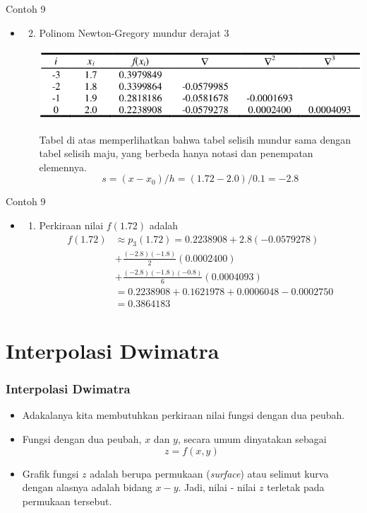 \documentclass[pdflatex,compress,mathserif]{beamer}
\begin{document}
\begin{frame}{Contoh 9}
	\begin{itemize}
		\item[]
		\begin{enumerate}
			\setcounter{enumi}{1}
			\item Polinom Newton-Gregory mundur derajat 3
			\begin{center}
				\includegraphics[width=\linewidth]{img/img28}
			\end{center}
			Tabel di atas memperlihatkan bahwa tabel selisih mundur sama dengan tabel selisih maju, yang berbeda hanya notasi dan penempatan elemennya.
			\[ s = (x - x_0)/h = (1.72 - 2.0)/0.1 = -2.8 \]
		\end{enumerate}
	\end{itemize}
\end{frame}

\begin{frame}{Contoh 9}
	\begin{itemize}
		\item[]
		\begin{enumerate}
			\item[] Perkiraan nilai $ f(1.72) $ adalah
			\begin{align*}
			f(1.72) &\approx p_3(1.72) = 0.2238908 + 2.8(-0.0579278) \\
			&+ \frac{(-2.8)(-1.8)}{2}(0.0002400) \\
			&+ \frac{(-2.8)(-1.8)(-0.8)}{6}(0.0004093) \\
			&= 0.2238908 + 0.1621978 + 0.0006048 - 0.0002750 \\
			&= 0.3864183
			\end{align*}
		\end{enumerate}
	\end{itemize}
\end{frame}

\section{Interpolasi Dwimatra}

\begin{frame}
	\frametitle{Interpolasi Dwimatra}
	\begin{itemize}
		\item Adakalanya kita membutuhkan perkiraan nilai fungsi dengan dua peubah.
		\item Fungsi dengan dua peubah, $ x $ dan $ y $, secara umum dinyatakan sebagai
		\[ z = f(x, y) \]
		\item Grafik fungsi $ z $ adalah berupa permukaan (\textit{surface}) atau selimut kurva dengan alasnya adalah bidang $ x-y $. Jadi, nilai - nilai $ z $ terletak pada permukaan tersebut.
	\end{itemize}
\end{frame}
\end{document}
